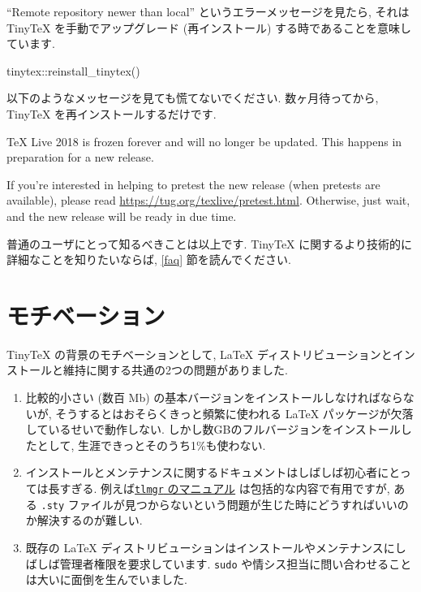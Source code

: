 \documentclass[
  xelatex,ja=standard,jafont=noto]{bxjsreport}
\newenvironment{Shaded}{\begin{snugshade}}{\end{snugshade}}
\newcommand{\FunctionTok}[1]{\textcolor[rgb]{0.00,0.00,0.00}{#1}}
\newcommand{\NormalTok}[1]{#1}
\newcommand{\SpecialCharTok}[1]{\textcolor[rgb]{0.00,0.00,0.00}{#1}}
\renewenvironment{quote}{\def\FrameCommand{{\color{quotebarcolor}{\vrule width 3pt}}\hspace{10pt}}\MakeFramed{\advance\hsize-\width\FrameRestore}}{\endMakeFramed}
\begin{document}
``Remote repository newer than local'' というエラーメッセージを見たら,
それは TinyTeX を手動でアップグレード (再インストール)
する時であることを意味しています.

\begin{Shaded}
\begin{Highlighting}[]
\NormalTok{tinytex}\SpecialCharTok{::}\FunctionTok{reinstall\_tinytex}\NormalTok{()}
\end{Highlighting}
\end{Shaded}

以下のようなメッセージを見ても慌てないでください. 数ヶ月待ってから,
TinyTeX を再インストールするだけです.

\begin{quote}
TeX Live 2018 is frozen forever and will no longer be updated. This
happens in preparation for a new release.
\end{quote}

\begin{quote}
If you're interested in helping to pretest the new release (when
pretests are available), please read
\url{https://tug.org/texlive/pretest.html}. Otherwise, just wait, and
the new release will be ready in due time.
\end{quote}

普通のユーザにとって知るべきことは以上です. TinyTeX
に関するより技術的に詳細なことを知りたいならば, \ref{faq}
節を読んでください.

\hypertarget{ux30e2ux30c1ux30d9ux30fcux30b7ux30e7ux30f3}{%
\section{モチベーション}\label{ux30e2ux30c1ux30d9ux30fcux30b7ux30e7ux30f3}}

TinyTeX の背景のモチベーションとして, LaTeX
ディストリビューションとインストールと維持に関する共通の2つの問題がありました.

\begin{enumerate}
\def\labelenumi{\arabic{enumi}.}
\item
  比較的小さい (数百 Mb)
  の基本バージョンをインストールしなければならないが,
  そうするとはおそらくきっと頻繁に使われる LaTeX
  パッケージが欠落しているせいで動作しない.
  しかし数GBのフルバージョンをインストールしたとして,
  生涯できっとそのうち1\%も使わない.
\item
  インストールとメンテナンスに関するドキュメントはしばしば初心者にとっては長すぎる.
  例えば\href{https://www.tug.org/texlive/doc/tlmgr.html}{\texttt{tlmgr}
  のマニュアル} は包括的な内容で有用ですが, ある \texttt{.sty}
  ファイルが見つからないという問題が生じた時にどうすればいいのか解決するのが難しい.
\item
  既存の LaTeX
  ディストリビューションはインストールやメンテナンスにしばしば管理者権限を要求しています.
  \texttt{sudo}
  や情シス担当に問い合わせることは大いに面倒を生んでいました.
\end{enumerate}
\end{document}
